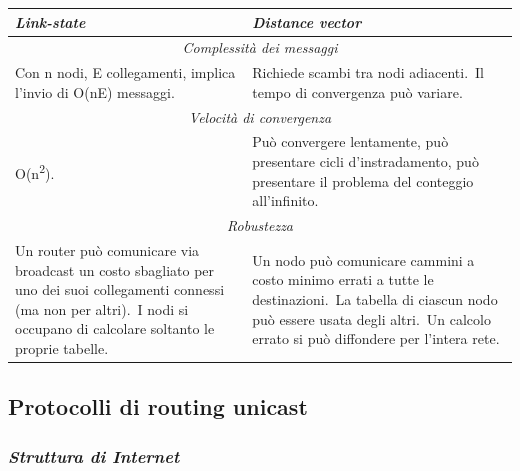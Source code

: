 \begin{table}[H]
    \centering
    \begin{tabular}{m{15em}|m{15em}}
        \textbf{\emph{Link-state}} & \textbf{\emph{Distance vector}}                                                                                          \\
        \hline
        \multicolumn{2}{c}{\emph{Complessità dei messaggi}}                                                                                                   \\
        \hline
        Con n nodi, E collegamenti, implica l’invio di O(nE) messaggi.\
                                   & Richiede scambi tra nodi adiacenti.\
        Il tempo di convergenza può variare.\
        \\
        \hline
        \multicolumn{2}{c}{\emph{Velocità di convergenza}}                                                                                                    \\
        \hline
        O(n\textsuperscript{2}).\
                                   & Può convergere lentamente, può presentare cicli d’instradamento, può presentare il problema del conteggio all’infinito.\
        \\
        \hline
        \multicolumn{2}{c}{\emph{Robustezza}}                                                                                                                 \\
        \hline
        Un router può comunicare via broadcast un costo sbagliato per uno dei suoi collegamenti connessi (ma non per altri).\
        I nodi si occupano di calcolare soltanto le proprie tabelle.\
                                   & Un nodo può comunicare cammini a costo minimo errati a tutte le destinazioni.\
        La tabella di ciascun nodo può essere usata degli altri.\
        Un calcolo errato si può diffondere per l’intera rete.                                                                                                \\
        \hline
    \end{tabular}
\end{table}

\subsection{Protocolli di routing unicast}

\subsubsection{\emph{Struttura di Internet}}

